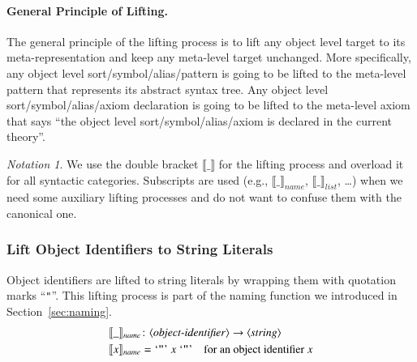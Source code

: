 \documentclass[UTF8,11pt]{article}
\newcounter{thmcounter}
\theoremstyle{plain}
\theoremstyle{definition}
\theoremstyle{remark}
\newtheorem{notation}   [thmcounter]{Notation}
\newcommand{\denote}[1]{\llbracket{#1}\rrbracket}
\newcommand{\quottt}[1]{\textrm{\lq\texttt{#1}\rq}}
\newcommand{\name}{\mathit{name}}
\newcommand{\llist}{\mathit{list}}
\newcommand{\syntacc}[1]{\text{$\langle$\textit{#1}$\rangle$}}
\begin{document}
\paragraph{General Principle of Lifting.}
The general principle of the lifting process is to lift any object level target
to its meta-representation and keep any meta-level target unchanged.
More specifically,
any object level sort/symbol/alias/pattern is going to be lifted to the
meta-level
pattern that represents its abstract syntax tree.
Any object level sort/symbol/alias/axiom declaration is going to be lifted to
the meta-level axiom that says ``the object level sort/symbol/alias/axiom is
declared in the current theory''.


\begin{notation}
 We use the double bracket $\denote{\_}$ for the lifting process and
 overload it for all syntactic categories.
 Subscripts are used (e.g., $\denote{\_}_\name$, $\denote{\_}_\llist$,
 \dots) when we need
 some auxiliary lifting processes and do not want to confuse them
 with the canonical one.
\end{notation}

\subsubsection{Lift Object Identifiers to String Literals}
Object identifiers are lifted to string literals by wrapping them with
quotation marks ``\verb|"|''.
This lifting process is part of the naming function we introduced in
Section~\ref{sec:naming}.
\begin{align*}
&\denote{\_}_\name \colon \syntacc{object-identifier} \to
\syntacc{string} \\
&\denote{x}_\name = \quottt{"} \ x \  \quottt{"} \quad \text{for an object
identifier $x$}
\end{align*}
\end{document}
